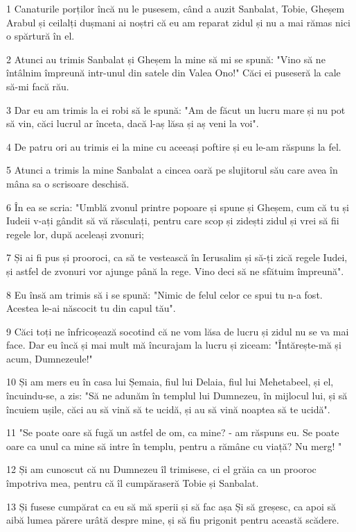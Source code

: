 \par 1 Canaturile porților încă nu le pusesem, când a auzit Sanbalat, Tobie, Gheșem Arabul și ceilalți dușmani ai noștri că eu am reparat zidul și nu a mai rămas nici o spărtură în el.
\par 2 Atunci au trimis Sanbalat și Gheșem la mine să mi se spună: "Vino să ne întâlnim împreună intr-unul din satele din Valea Ono!" Căci ei puseseră la cale să-mi facă rău.
\par 3 Dar eu am trimis la ei robi să le spună: "Am de făcut un lucru mare și nu pot să vin, căci lucrul ar înceta, dacă l-aș lăsa și aș veni la voi".
\par 4 De patru ori au trimis ei la mine cu aceeași poftire și eu le-am răspuns la fel.
\par 5 Atunci a trimis la mine Sanbalat a cincea oară pe slujitorul său care avea în mâna sa o scrisoare deschisă.
\par 6 În ea se scria: "Umblă zvonul printre popoare și spune și Gheșem, cum că tu și Iudeii v-ați gândit să vă răsculați, pentru care scop și zidești zidul și vrei să fii regele lor, după aceleași zvonuri;
\par 7 Și ai fi pus și prooroci, ca să te vestească în Ierusalim și să-ți zică regele Iudei, și astfel de zvonuri vor ajunge până la rege. Vino deci să ne sfătuim împreună".
\par 8 Eu însă am trimis să i se spună: "Nimic de felul celor ce spui tu n-a fost. Acestea le-ai născocit tu din capul tău".
\par 9 Căci toți ne înfricoșează socotind că ne vom lăsa de lucru și zidul nu se va mai face. Dar eu încă și mai mult mă încurajam la lucru și ziceam: "Întărește-mă și acum, Dumnezeule!"
\par 10 Și am mers eu în casa lui Șemaia, fiul lui Delaia, fiul lui Mehetabeel, și el, încuindu-se, a zis: "Să ne adunăm în templul lui Dumnezeu, în mijlocul lui, și să încuiem ușile, căci au să vină să te ucidă, și au să vină noaptea să te ucidă".
\par 11 "Se poate oare să fugă un astfel de om, ca mine? - am răspuns eu. Se poate oare ca unul ca mine să intre în templu, pentru a rămâne cu viață? Nu merg! "
\par 12 Și am cunoscut că nu Dumnezeu îl trimisese, ci el grăia ca un prooroc împotriva mea, pentru că îl cumpăraseră Tobie și Sanbalat.
\par 13 Și fusese cumpărat ca eu să mă sperii și să fac așa Și să greșesc, ca apoi să aibă lumea părere urâtă despre mine, și să fiu prigonit pentru această scădere.
